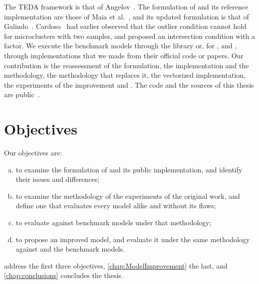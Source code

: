 The TEDA framework is that of Angelov~\cite{angelov2014outside}. The formulation of \MicroTEDAClus and its reference implementation are those of Maia et al.~\cite{maia2020evolvclus}, and its updated formulation is that of Galindo~\cite{galindo2021lastmile}. Cardoso~\cite{cardoso2022microtedaclus} had earlier observed that the outlier condition cannot hold for microclusters with two samples, and proposed an intersection condition with a factor. We execute the benchmark models through the  library \cite{montiel2021river} or, for \CEDAS, \TEDACloud and \AutoCloud, through implementations that we made from their official code or papers. Our contribution is the reassessment of the formulation, the implementation and the methodology, the methodology that replaces it, the vectorized implementation, the experiments of the improvement and \MicroTEDAClusPlus. The code and the sources of this thesis are public~\cite{carvalho2026microtedaclusreassessment}.

\section{Objectives}
\label{sec:objectives}

Our objectives are:

\begin{enumerate}[a)]
\item to examine the formulation of \MicroTEDAClus and its public implementation, and identify their issues and differences;
\item to examine the methodology of the experiments of the original work, and define one that evaluates every model alike and without its flaws;
\item to evaluate \MicroTEDAClus against benchmark models under that methodology;
\item to propose an improved model, and evaluate it under the same methodology against \MicroTEDAClus and the benchmark models.
\end{enumerate}

 address the first three objectives, \cref{chap:ModelImprovement} the last, and \cref{chap:conclusions} concludes the thesis.

\clearpage
